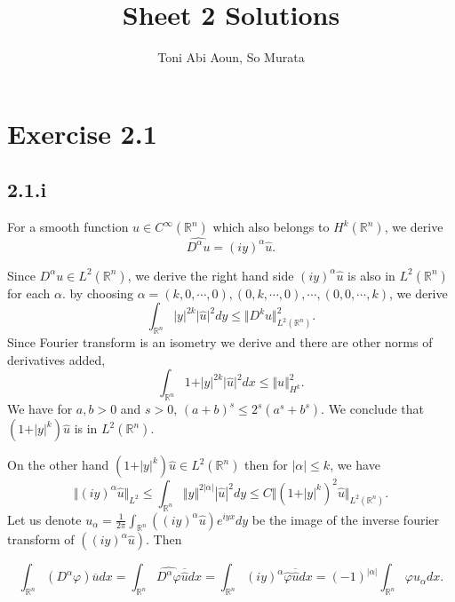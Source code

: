 \documentclass{article}
\title{Sheet 2 Solutions}
\author{Toni Abi Aoun, So Murata}
\date{}
\begin{document}
\maketitle

\section*{Exercise 2.1}

\subsection*{2.1.i}

For a smooth function $u\in C^\infty(\mathbb{R}^n)$ which also belongs to $H^k(\mathbb{R}^n)$, we derive
\begin{equation*}
\widehat{D^\alpha u} = (iy)^\alpha \hat{u}.
\end{equation*}

Since $D^\alpha u\in L^2(\mathbb{R}^n)$, we derive the right hand side $(iy)^\alpha \hat{u}$ is also in $L^2(\mathbb{R}^n)$ for each $\alpha$. by choosing $\alpha = (k,0,\cdots,0),(0,k,\cdots,0),\cdots,(0,0,\cdots,k)$, we derive
\begin{equation*}
\int_{\mathbb{R}^n}\vert y\vert^{2k}\vert\hat{u}\vert^2 dy \leq \Vert D^k u\Vert^2_{L^2(\mathbb{R}^n)}.
\end{equation*}
Since Fourier transform is an isometry we derive and there are other norms of derivatives added,
\begin{equation*}
\int_{\mathbb{R}^n}1+\vert y\vert^{2k}\vert\hat{u}\vert^2dx\leq \Vert u\Vert^2_{H^k}.
\end{equation*}
We have for $a,b>0$ and $s>0$, $(a+b)^s\leq 2^s(a^s+b^s)$.
We conclude that $(1+\vert y\vert^{k})\hat{u}$ is in $L^2(\mathbb{R}^n)$. \\
\par On the other hand $(1+\vert y\vert^{k})\hat{u}\in L^2(\mathbb{R}^n)$ then for $|\alpha|\leq k$, we have 
\begin{equation}
\label{L2_derivative}
\Vert (iy)^\alpha\hat{u}\Vert_{L^2} \leq \int_{\mathbb{R}^n}\Vert y\Vert^{2|\alpha|}|\hat{u}|^2 dy\leq C\Vert(1+\vert y\vert^{k})^2\hat{u}\Vert_{L^2(\mathbb{R}^n)}.
\end{equation}
Let us denote $u_\alpha = {\frac 1 {2\pi}}\int_{\mathbb{R}^n}((iy)^\alpha\hat{u})e^{iyx}dy$ be the image of the inverse fourier transform of $((iy)^\alpha\hat{u})$. Then

\begin{equation*}
\int_{\mathbb{R}^n}(D^\alpha\varphi)\overline{u}dx=\int_{\mathbb{R}^n}\widehat{D^\alpha\varphi}\overline{\hat{u}}dx = \int_{\mathbb{R}^n}(iy)^\alpha\hat{\varphi}\overline{\hat{u}}dx =(-1)^{|\alpha|} \int_{\mathbb{R}^n}\varphi u_\alpha dx.
\end{equation*}
\end{document}
